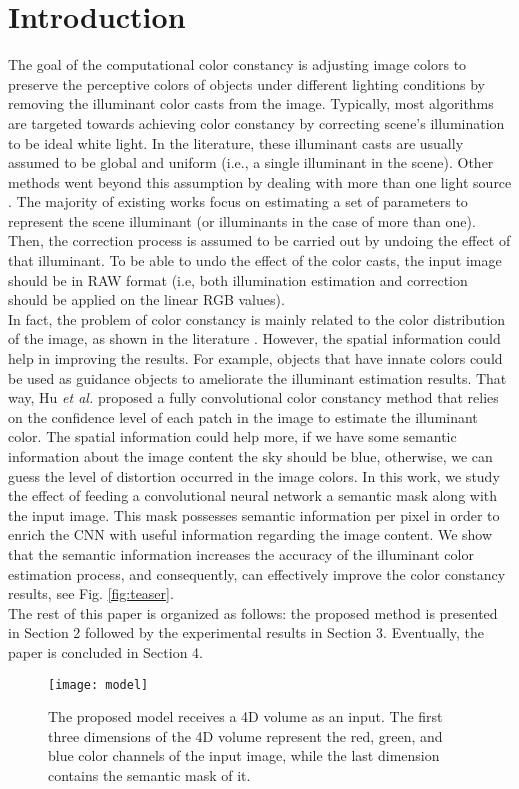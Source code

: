 \documentclass[sigplan]{acmart}
\begin{document}
\section{Introduction}
The goal of the computational color constancy is adjusting image colors to preserve the perceptive colors of objects under different lighting conditions by removing the illuminant color casts from the image. Typically, most algorithms are targeted towards achieving color constancy by correcting scene's illumination to be ideal white light. In the literature, these illuminant casts are usually assumed to be global and uniform (i.e., a single illuminant in the scene). Other methods went beyond this assumption by dealing with more than one light source \cite{beigpour2014multi, cheng2016two, abdelhamed2016two}. The majority of existing works focus on estimating a set of parameters to represent the scene illuminant (or illuminants in the case of more than one). Then, the correction process is assumed to be carried out by undoing the effect of that illuminant. To be able to undo the effect of the color casts, the input image should be in RAW format (i.e, both illumination estimation and correction should be applied on the linear RGB values). 
\\
In fact, the problem of color constancy is mainly related to the color distribution of the image, as shown in the literature \cite{nus, barron2015convolutional, barron2017fast, zhang2018fully}. However, the spatial information could help in improving the results. For example, objects that have innate colors could be used as guidance objects to ameliorate the illuminant estimation results. That way, Hu \textit{et al.} \cite{hu2017fc} proposed a fully convolutional color constancy method that relies on the confidence level of each patch in the image to estimate the illuminant color. The spatial information could help more, if we have some semantic information about the image content \textemdash the sky should be blue, otherwise, we can guess the level of distortion occurred in the image colors. In this work, we study the effect of feeding a convolutional neural network a semantic mask along with the input image. This mask possesses semantic information per pixel in order to enrich the CNN with useful information regarding the image content. We show that the semantic information increases the accuracy of the illuminant color estimation process, and consequently, can effectively improve the color constancy results, see Fig. \ref{fig:teaser}. 
\\
The rest of this paper is organized as follows: the proposed method is presented in Section 2 followed by the experimental results in Section 3. Eventually, the paper is concluded in Section 4. 
\begin{figure*}
  \texttt{[image: model]}
  \caption{The proposed model receives a 4D volume as an input. The first three dimensions of the 4D volume represent the red, green, and blue color channels of the input image, while the last dimension contains the semantic mask of it.}
  \label{model}
\end{figure*}
\end{document}

